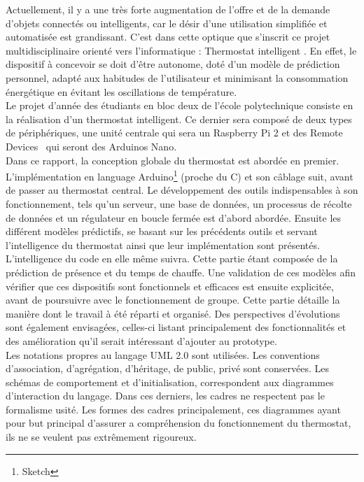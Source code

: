 \documentclass[11pt,a4paper,11pt]{report}
\begin{document}
Actuellement, il y a une très forte augmentation de l’offre et de la demande d’objets connectés ou intelligents, car le désir d’une utilisation simplifiée et automatisée est grandissant. C’est dans cette optique que s’inscrit ce projet multidisciplinaire orienté vers l’informatique : \og Thermostat intelligent \fg. En effet, le dispositif à concevoir se doit d'être autonome, doté d’un modèle de prédiction personnel, adapté aux habitudes de l’utilisateur et minimisant la consommation énergétique en évitant les oscillations de température.\\

Le projet d’année des étudiants en bloc deux de l’école polytechnique consiste en la réalisation d’un thermostat intelligent. Ce dernier sera composé de deux types de périphériques, une unité centrale qui sera un Raspberry Pi 2 et des \og Remote Devices \fg ~qui seront des Arduinos Nano.\\

Dans ce rapport, la conception globale du thermostat est abordée en premier. L'implémentation en language Arduino\footnote{Sketch} (proche du C) et son câblage suit, avant de passer au thermostat central. Le développement des outils indispensables à son fonctionnement, tels qu'un serveur, une base de données, un processus de récolte de données et un régulateur en boucle fermée est d'abord abordée. Ensuite les différent modèles prédictifs, se basant sur les précédents outils et servant l'intelligence du thermostat ainsi que leur implémentation sont présentés. L'intelligence du code en elle même suivra. Cette partie étant composée de la prédiction de présence et du temps de chauffe. Une validation de ces modèles afin vérifier que ces dispositifs sont fonctionnels et efficaces est ensuite explicitée, avant de poursuivre avec le fonctionnement de groupe. Cette  partie détaille la manière dont le travail à été réparti et organisé. Des perspectives d'évolutions sont également envisagées, celles-ci listant principalement des fonctionnalités et des amélioration qu'il serait intéressant d'ajouter au prototype.\\

Les notations propres au langage UML 2.0 sont utilisées. Les conventions d'association, d'agrégation, d'héritage, de public, privé sont conservées. Les schémas de comportement et d'initialisation, correspondent aux diagrammes d'interaction du langage. Dans ces derniers, les cadres ne respectent pas le formalisme usité. Les formes des cadres principalement, ces diagrammes ayant pour but principal d'assurer a compréhension du fonctionnement du thermostat, ils ne se veulent pas extrêmement rigoureux.\\
\end{document}
